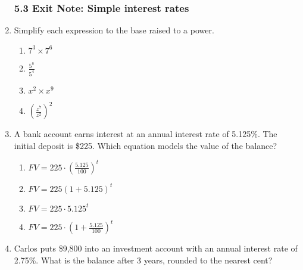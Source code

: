 \documentclass[12pt, twoside]{article}
\begin{document}
\begin{enumerate}
\newpage
\subsubsection*{5.3 Exit Note: Simple interest rates}
\item Simplify each expression to the base raised to a power.
    \begin{multicols}{2}
    \begin{enumerate}[itemsep=0.5cm]
        \item $7^3 \times 7^6$
        \item $\displaystyle \frac{5^8}{5^4}$
        \item $x^2 \times x^9$
        \item $\displaystyle \left( \frac{z^7}{z^2}\right)^{2}$
    \end{enumerate}
    \end{multicols}

\item A bank account earns interest at an annual interest rate of 5.125\%. The initial deposit is \$225. Which equation models the value of the balance?
\begin{multicols}{2}
    \begin{enumerate}[itemsep=0.5cm]
        \item $\displaystyle FV=225 \cdot \left( \frac{5.125}{100}\right)^{t}$
        \item $FV=225 (1+5.125)^{t}$
        \item $FV=225 \cdot 5.125^{t}$
        \item $\displaystyle FV=225 \cdot \left(1+ \frac{5.125}{100}\right)^{t}$
    \end{enumerate}
\end{multicols}

\item Carlos puts \$9,800 into an investment account with an annual interest rate of 2.75\%. What is the balance after 3 years, rounded to the nearest cent? \vspace{2cm}


\end{enumerate}
\end{document}
